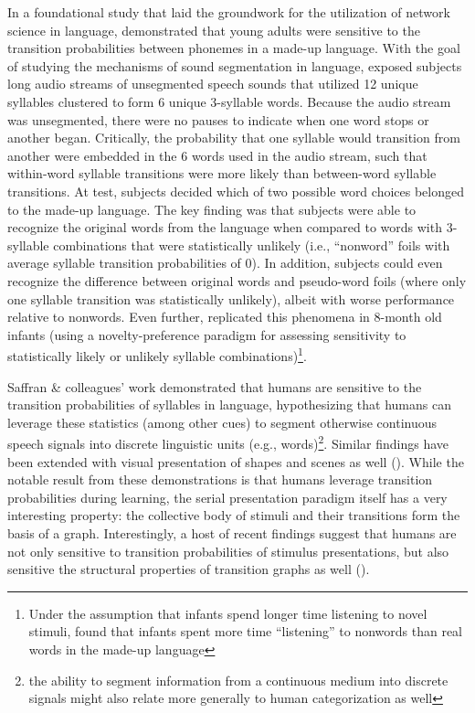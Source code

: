 \documentclass[12pt]{article}
\let\oldcite=\cite
\let\oldtextcite=\textcite
\renewcommand{\cite}[1]{\textcolor[rgb]{0, .121, .388}{\oldcite{#1}}}
\renewcommand{\textcite}[1]{\textcolor[rgb]{0, .121, .388}{\oldtextcite{#1}}}
\begin{document}
In a foundational study that laid the groundwork for the utilization of network science in language, \textcite{saffran1996word} demonstrated that young adults were sensitive to the transition probabilities between phonemes in a made-up language. With the goal of studying the mechanisms of sound segmentation in language, \textcite{saffran1996word} exposed subjects long audio streams of unsegmented speech sounds that utilized 12 unique syllables clustered to form 6 unique 3-syllable words. Because the audio stream was unsegmented, there were no pauses to indicate when one word stops or another began. Critically, the probability that one syllable would transition from another were embedded in the 6 words used in the audio stream, such that within-word syllable transitions were more likely than between-word syllable transitions. At test, subjects decided which of two possible word choices belonged to the made-up language. The key finding was that subjects were able to recognize the original words from the language when compared to words with 3-syllable combinations that were statistically unlikely (i.e., ``nonword'' foils with average syllable transition probabilities of 0). In addition, subjects could even recognize the difference between original words and pseudo-word foils (where only one syllable transition was statistically unlikely), albeit with worse performance relative to nonwords. Even further, \textcite{saffran1996statistical} replicated this phenomena in 8-month old infants (using a novelty-preference paradigm for assessing sensitivity to statistically likely or unlikely syllable combinations)\footnote{ Under the assumption that infants spend longer time listening to novel stimuli, \textcite{saffran1996statistical} found that infants spent more time ``listening'' to nonwords than real words in the made-up language}.

Saffran \& colleagues' work demonstrated that humans are sensitive to the transition probabilities of syllables in language, hypothesizing that humans can leverage these statistics (among other cues) to segment otherwise continuous speech signals into discrete linguistic units (e.g., words)\footnote{the ability to segment information from a continuous medium into discrete signals might also relate more generally to human categorization as well}. Similar findings have been extended with visual presentation of shapes and scenes as well (\cite{turk2005automaticity,brady2008statistical}). While the notable result from these demonstrations is that humans leverage transition probabilities during learning, the serial presentation paradigm itself has a very interesting property: the collective body of stimuli and their transitions form the basis of a graph. Interestingly, a host of recent findings suggest that humans are not only sensitive to transition probabilities of stimulus presentations, but also sensitive the structural properties of transition graphs as well (\cite{lynn2019graph,kahn2018network,karuza2017process,karuza2019human}). 
\end{document}
